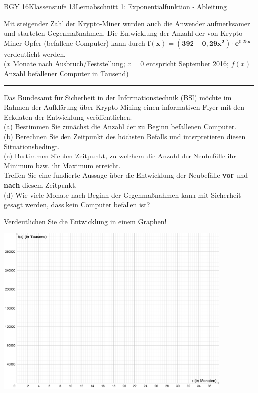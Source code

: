 \documentclass[oneside,openany,headings=optiontotoc,11pt,numbers=noenddot]{scrreprt}
\begin{document}
\begin{worksheet}{BGY 16}{Klassenstufe 13}{Lernabschnitt 1: Exponentialfunktion - Ableitung}
\begin{framed}
		\end{framed}
		\newpage
		\begin{framed}
			\noindent
			Mit steigender Zahl der Krypto-Miner wurden auch die Anwender aufmerksamer und starteten Gegenmaßnahmen. Die Entwicklung der Anzahl der von Krypto-Miner-Opfer (befallene Computer) kann durch \(\mathbf{f(x) = (392-0,29x^2)\cdot{}e^{0.25x}}\) verdeutlicht werden.\\
			(\(x\) Monate nach Ausbruch/Feststellung; \(x = 0\) entspricht September 2016; \(f(x)\) Anzahl befallener Computer in Tausend)\\
			\rule{\textwidth}{0.1pt}
			\noindent
			Das Bundesamt für Sicherheit in der Informationstechnik (BSI) möchte im Rahmen der Aufklärung über Krypto-Mining einen informativen Flyer mit den Eckdaten der Entwicklung veröffentlichen.\\
			(a) Bestimmen Sie zunächst die Anzahl der zu Beginn befallenen Computer.\\
			(b) Berechnen Sie den Zeitpunkt des höchsten Befalls und interpretieren diesen Situationsbedingt.\\
			(c) Bestimmen Sie den Zeitpunkt, zu welchem die Anzahl der Neubefälle ihr Minimum bzw. ihr Maximum erreicht.\\
			Treffen Sie eine fundierte Aussage über die Entwicklung der Neubefälle \textbf{vor} und \textbf{nach} diesem Zeitpunkt.\\
			(d) Wie viele Monate nach Beginn der Gegenmaßnahmen kann mit Sicherheit gesagt werden, dass kein Computer befallen ist?
		\end{framed}
		\begin{framed}
			\noindent
			Verdeutlichen Sie die Entwicklung in einem Graphen!\\
			\par\noindent
			\includegraphics[width=0.86\textwidth]{../99_Bilder/KoordLeer_2.png}
		\end{framed}
	\end{worksheet}
\end{document}

